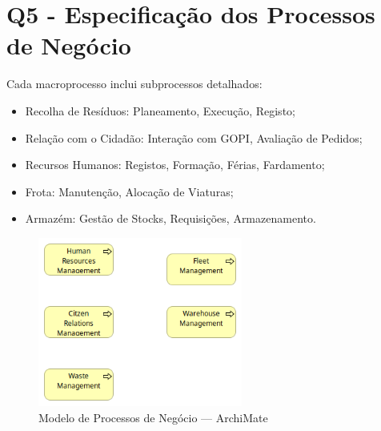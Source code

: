 \documentclass[12pt,a4paper,final]{article}
\begin{document}
    \section*{Q5 - Especificação dos Processos de Negócio}\label{sec:especificacao-dos-processos-de-negocio}
    Cada macroprocesso inclui subprocessos detalhados:
    \begin{itemize}
        \item Recolha de Resíduos: Planeamento, Execução, Registo;
        \item Relação com o Cidadão: Interação com GOPI, Avaliação de Pedidos;
        \item Recursos Humanos: Registos, Formação, Férias, Fardamento;
        \item Frota: Manutenção, Alocação de Viaturas;
        \item Armazém: Gestão de Stocks, Requisições, Armazenamento.
    \end{itemize}

    \newpage

    \begin{figure}[h!]
        \centering
        \includegraphics[width=0.6\textwidth]{Q5 - High Level Specification of Business Process}
        \caption{Modelo de Processos de Negócio — ArchiMate}
        \label{fig:5}
    \end{figure}
\end{document}
